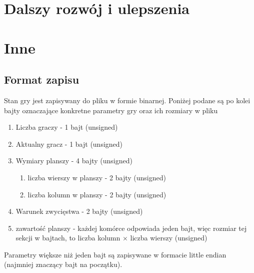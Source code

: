 \documentclass{article}
\begin{document}
\section{Dalszy rozwój i ulepszenia}

\section{Inne}

\subsection{Format zapisu}

Stan gry jest zapisywany do pliku w formie binarnej. Poniżej podane są po kolei bajty oznaczające konkretne parametry 
gry oraz ich rozmiary w pliku

\begin{enumerate}
\item Liczba graczy - 1 bajt (unsigned)
\item Aktualny gracz - 1 bajt (unsigned)
\item Wymiary planszy - 4 bajty (unsigned)
  \begin{enumerate}
    \item liczba wierszy w planszy - 2 bajty (unsigned)
    \item liczba kolumn w planszy - 2 bajty (unsigned)
  \end{enumerate}
\item Warunek zwycięstwa - 2 bajty (unsigned)
\item zawartość planszy - każdej komórce odpowiada jeden bajt, więc rozmiar tej sekcji w bajtach, to liczba kolumn 
$\times$ liczba wierszy (unsigned)
\end{enumerate}

Parametry większe niż jeden bajt są zapisywane w formacie little endian (najmniej znaczący bajt na początku).
\end{document}
